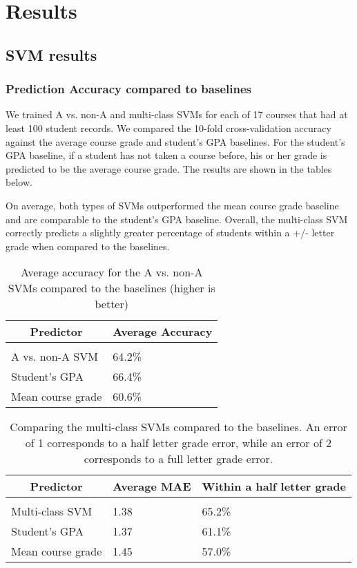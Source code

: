 
\section{Results}

\subsection{SVM results}

\subsubsection{Prediction Accuracy compared to baselines}

We trained A vs. non-A and multi-class SVMs for each of 17 courses that had at least 100 student records. We compared the 10-fold cross-validation accuracy against the average course grade and student's GPA baselines. For the student's GPA baseline, if a student has not taken a course before, his or her grade is predicted to be the average course grade. The results are shown in the tables below.

On average, both types of SVMs outperformed the mean course grade baseline and are comparable to the student's GPA baseline. Overall, the multi-class SVM correctly predicts a slightly greater percentage of students within a +/- letter grade when compared to the baselines.

\begin{table}[htbp]
\caption{Average accuracy for the A vs. non-A SVMs compared to the baselines (higher is better)}
\label{svm-accuracy-table}
\begin{center}
\begin{tabular}{ll}
\multicolumn{1}{c}{\bf Predictor}  &\multicolumn{1}{c}{\bf Average Accuracy}
\\ \hline \\
A vs. non-A SVM &64.2\% \\
Student's GPA   &66.4\% \\
Mean course grade &60.6\% \\
\end{tabular}
\end{center}
\end{table}


\begin{table}[htbp]
\caption{Comparing the multi-class SVMs compared to the baselines. An error of 1 corresponds to a half letter grade error, while an error of 2 corresponds to a full letter grade error.}
\label{svm-mae-table}
\begin{center}
\begin{tabular}{lll}
\multicolumn{1}{c}{\bf Predictor}  &\multicolumn{1}{c}{\bf Average MAE}  &\multicolumn{1}{c}{\bf Within a half letter grade}
\\ \hline \\
Multi-class SVM &1.38 & 65.2\%\\
Student's GPA   &1.37 & 61.1\%\\
Mean course grade &1.45 &57.0\% \\
\end{tabular}
\end{center}
\end{table}


